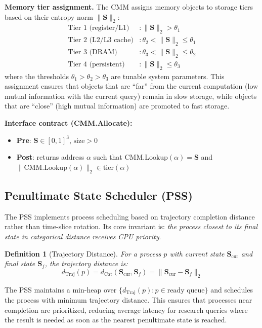\documentclass[12pt,twocolumn]{article}
\newtheorem{definition}{Definition}[section]
\DeclareMathOperator{\Cat}{Cat}
\DeclareMathOperator{\Traj}{Traj}
\begin{document}
\textbf{Memory tier assignment.} The CMM assigns memory objects to storage tiers based on their entropy norm $\|\mathbf{S}\|_2$:
\begin{align}
\text{Tier 1 (register/L1)} &: \|\mathbf{S}\|_2 > \theta_1 \\
\text{Tier 2 (L2/L3 cache)} &: \theta_2 < \|\mathbf{S}\|_2 \leq \theta_1 \\
\text{Tier 3 (DRAM)}        &: \theta_3 < \|\mathbf{S}\|_2 \leq \theta_2 \\
\text{Tier 4 (persistent)}  &: \|\mathbf{S}\|_2 \leq \theta_3
\end{align}
where the thresholds $\theta_1 > \theta_2 > \theta_3$ are tunable system parameters. This assignment ensures that objects that are ``far'' from the current computation (low mutual information with the current query) remain in slow storage, while objects that are ``close'' (high mutual information) are promoted to fast storage.

\textbf{Interface contract (CMM.Allocate):}
\begin{itemize}
\item \textbf{Pre}: $\mathbf{S} \in [0,1]^3$, $\text{size} > 0$
\item \textbf{Post}: returns address $\alpha$ such that $\text{CMM.Lookup}(\alpha) = \mathbf{S}$ and $\|\text{CMM.Lookup}(\alpha)\|_2 \in \text{tier}(\alpha)$
\end{itemize}

\subsection{Penultimate State Scheduler (PSS)}

The PSS implements process scheduling based on trajectory completion distance rather than time-slice rotation. Its core invariant is: \emph{the process closest to its final state in categorical distance receives CPU priority}.

\begin{definition}[Trajectory Distance]
For a process $p$ with current state $\mathbf{S}_{\text{cur}}$ and final state $\mathbf{S}_f$, the \emph{trajectory distance} is:
\begin{equation}
d_{\Traj}(p) = d_{\Cat}(\mathbf{S}_{\text{cur}}, \mathbf{S}_f) = \|\mathbf{S}_{\text{cur}} - \mathbf{S}_f\|_2
\end{equation}
\end{definition}

The PSS maintains a min-heap over $\{d_{\Traj}(p) : p \in \text{ready queue}\}$ and schedules the process with minimum trajectory distance. This ensures that processes near completion are prioritized, reducing average latency for research queries where the result is needed as soon as the nearest penultimate state is reached.
\end{document}
